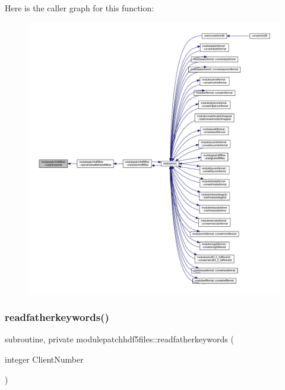 Here is the caller graph for this function\+:\nopagebreak
\begin{figure}[H]
\begin{center}
\leavevmode
\includegraphics[width=350pt]{namespacemodulepatchhdf5files_a5a84e7c89a2de8e50674a804e7e307b0_icgraph}
\end{center}
\end{figure}
\mbox{\label{namespacemodulepatchhdf5files_a82e18c8d58903480429c989b796d36e5}} 
\subsubsection{\texorpdfstring{readfatherkeywords()}{readfatherkeywords()}}
{\footnotesize\ttfamily subroutine, private modulepatchhdf5files\+::readfatherkeywords (\begin{DoxyParamCaption}\item[{integer}]{Client\+Number }\end{DoxyParamCaption})\hspace{0.3cm}{\ttfamily [private]}}

